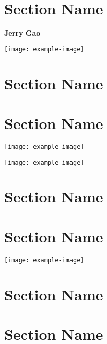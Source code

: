 \documentclass[a4paper]{article}
\newenvironment{Figure}
  {\par\medskip\noindent\minipage{\linewidth}}
  {\endminipage\par\medskip}
\newcommand{\sectionattrib}[1]{\vspace{-1cm}\noindent\small\textbf{#1}}
\begin{document}
    \begin{multicols}{2}
        \section{Section Name}
        \sectionattrib{Jerry Gao}
        \begin{Figure}
            \centering
            \texttt{[image: example-image]}
        \end{Figure}
        \lipsum[3-5]
        \section{Section Name}
        \lipsum[3-5]
        \section{Section Name}
        \begin{Figure}
            \centering
            \texttt{[image: example-image]}
        \end{Figure}
        \lipsum[3-5]
        \begin{Figure}
            \centering
            \texttt{[image: example-image]}
        \end{Figure}
        \section{Section Name}
        \lipsum[3-5]
        \section{Section Name}
        \lipsum[3-5]
        \begin{Figure}
            \centering
            \texttt{[image: example-image]}
        \end{Figure}
        \lipsum[3-5]
        \section{Section Name}
        \lipsum[3-5]
        \section{Section Name}
        \lipsum[3-5]                            
    \end{multicols}
    
\end{document}
